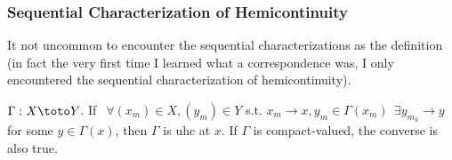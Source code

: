 \documentclass{article}
\begin{document}
\subsubsection{Sequential Characterization of Hemicontinuity}
\label{ssub:sequential_characterization_of_hemicontinuity}

\begin{remark}
  It not uncommon to encounter the sequential characterizations as the definition (in fact the very first time I learned what a correspondence was, I only encountered the sequential characterization of hemicontinuity).
\end{remark}

\begin{theorem}\label{thm:lecture3_compactness_uhc_sequential}
  $\Gamma: X \toto Y$. If $~~\forall (x_m) \in X, (y_m) \in Y$ s.t. $x_m \to x, y_m \in \Gamma(x_m) ~~ \exists y_{m_k} \to y$ for some $y \in \Gamma(x)$, then $\Gamma$ is uhc at $x$. If $\Gamma$ is compact-valued, the converse is also true.
\end{theorem}
\end{document}
